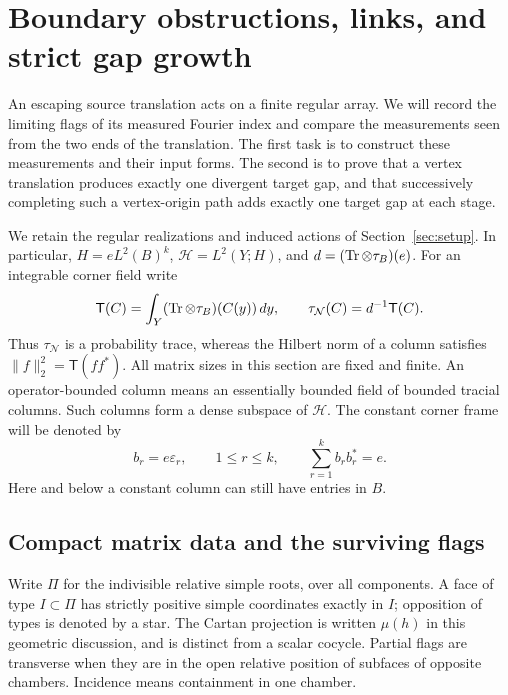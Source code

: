 \section{Boundary obstructions, links, and strict gap growth}
\label{sec:links}

An escaping source translation acts on a finite regular array. We will
record the limiting flags of its measured Fourier index and compare the
measurements seen from the two ends of the translation. The first task is
to construct these measurements and their input forms. The second is to
prove that a vertex translation produces exactly one divergent target
gap, and that successively completing such a vertex-origin path
adds exactly one target gap at each stage.

We retain the regular realizations and induced actions of
Section~\ref{sec:setup}. In particular,
\(H=eL^2(B)^k\), \(\mathcal H=L^2(Y;H)\), and
\(d=(\operatorname{Tr}\otimes\tau_B)(e)\). For an integrable corner field write
\[
 \mathsf T(C)=\int_Y(\operatorname{Tr}\otimes\tau_B)(C(y))\,dy,
 \qquad \tau_{\mathcal N}(C)=d^{-1}\mathsf T(C).
\]
Thus \(\tau_{\mathcal N}\) is a probability trace, whereas the Hilbert
norm of a column satisfies \(\|f\|_2^2=\mathsf T(ff^*)\).
All matrix sizes in this section are fixed and finite. An
operator-bounded column means an essentially bounded field of bounded
tracial columns. Such columns form a dense subspace of \(\mathcal H\).
The constant corner frame will be denoted by
\[
 b_r=e\varepsilon_r,\qquad 1\leq r\leq k,
 \qquad \sum_{r=1}^k b_rb_r^*=e.
\]
Here and below a constant column can still have entries in \(B\).

\subsection{Compact matrix data and the surviving flags}

Write \(\Pi\) for the indivisible relative simple roots, over all
components. A face of type \(I\subset\Pi\) has strictly positive
simple coordinates exactly in \(I\); opposition of types is denoted
by a star. The Cartan projection is written \(\mu(h)\) in this
geometric discussion, and is distinct from a scalar cocycle. Partial
flags are transverse when they are in the open relative position of
subfaces of opposite chambers. Incidence means containment in one
chamber.

